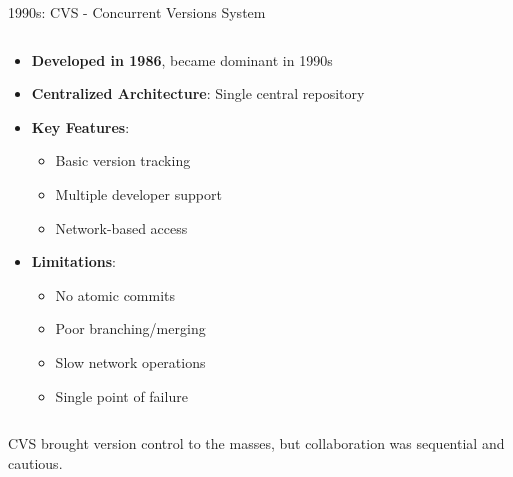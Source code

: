 \documentclass{beamer}
\begin{document}
\begin{frame}{1990s: CVS - Concurrent Versions System}
\begin{columns}
    \begin{column}{0.6\textwidth}
        \begin{itemize}
            \item \textbf{Developed in 1986}, became dominant in 1990s
            \item \textbf{Centralized Architecture}: Single central repository
            \item \textbf{Key Features}:
                \begin{itemize}
                    \item Basic version tracking
                    \item Multiple developer support
                    \item Network-based access
                \end{itemize}
            \item \textbf{Limitations}:
                \begin{itemize}
                    \item No atomic commits
                    \item Poor branching/merging
                    \item Slow network operations
                    \item Single point of failure
                \end{itemize}
        \end{itemize}
    \end{column}
\end{columns}
\begin{block}{}
CVS brought version control to the masses, but collaboration was sequential and cautious.
\end{block}
\end{frame}
\end{document}
